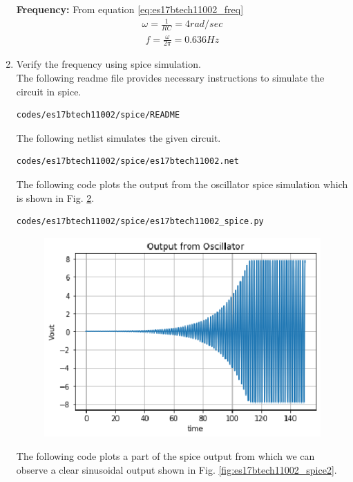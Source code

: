 \begin{enumerate}[label=\arabic*.,ref=\theenumi]
\begin{figure}[!ht]
\caption{}
\label{fig:es17btech11002_fig8}
\end{figure}
\textbf{Frequency:} From equation \eqref{eq:es17btech11002_freq}
\begin{align}
\omega = \frac{1}{RC} = 4 rad/sec
\end{align}
\begin{align}
f = \frac{\omega }{2\pi} = 0.636 Hz
\end{align}
\item Verify the frequency using spice simulation.\\
\solution The following readme file provides necessary instructions to simulate the circuit in spice.
\begin{lstlisting}
codes/es17btech11002/spice/README
\end{lstlisting}
The following netlist simulates the given circuit.
\begin{lstlisting}
codes/es17btech11002/spice/es17btech11002.net
\end{lstlisting}
The following code plots the output from the oscillator spice simulation which is shown in Fig. \ref{fig:es17btech11002_spice}.
\begin{lstlisting}
codes/es17btech11002/spice/es17btech11002_spice.py
\end{lstlisting}
\renewcommand{\thefigure}{\theenumi.\arabic{figure}}
%
\begin{figure}[!ht]
\centering
\includegraphics[width=\columnwidth]{./figs/es17btech11002/es17btech11002_spice.eps}
\caption{}
\label{fig:es17btech11002_spice}
\end{figure}
%
The following code plots a part of the spice output from which we can observe a clear sinusoidal output shown in Fig. \ref{fig:es17btech11002_spice2}.

\end{enumerate}
